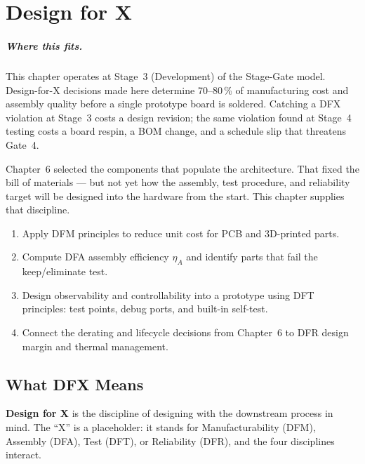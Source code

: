 \chapter{Design for X}
\label{ch7}

\paragraph{Where this fits.}
This chapter operates at Stage~3 (Development) of the Stage-Gate model.
Design-for-X decisions made here determine 70--80\,\% of manufacturing cost and
assembly quality before a single prototype board is soldered.
Catching a DFX violation at Stage~3 costs a design revision; the same violation
found at Stage~4 testing costs a board respin, a BOM change, and a schedule slip
that threatens Gate~4.

Chapter~6 selected the components that populate the architecture.
That fixed the bill of materials --- but not yet how the assembly, test procedure,
and reliability target will be designed into the hardware from the start.
This chapter supplies that discipline.

\begin{enumerate}
  \item Apply DFM principles to reduce unit cost for PCB and 3D-printed parts.
  \item Compute DFA assembly efficiency $\eta_A$ and identify parts that fail the
        keep/eliminate test.
  \item Design observability and controllability into a prototype using DFT principles:
        test points, debug ports, and built-in self-test.
  \item Connect the derating and lifecycle decisions from Chapter~6 to DFR design
        margin and thermal management.
\end{enumerate}

\section{What DFX Means}
\label{sec:ch7-intro}

\textbf{Design for X} is the discipline of designing with the
downstream process in mind.
The ``X'' is a placeholder: it stands for Manufacturability (DFM), Assembly (DFA),
Test (DFT), or Reliability (DFR), and the four disciplines interact.

